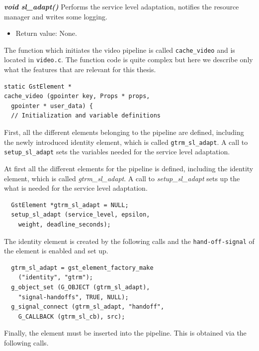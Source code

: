 \documentclass[nobiblatex]{LTHthesis}
\begin{document}
\begin{framed}
	\begin{flushleft}	
		\emph{\textbf{{void sl\_adapt()}}}
		Performs the service level adaptation, notifies the resource manager 
    and writes some logging.
		\begin{itemize}
		\item Return value: None.
		\end{itemize}
		\end{flushleft}
\end{framed}

The function which initiates the video pipeline is called 
\texttt{cache\_video} and is located in \texttt{video.c}. The function code
is quite complex but here we describe only what the features that are
relevant for this thesis.

\begin{lstlisting}
static GstElement *
cache_video (gpointer key, Props * props, 
  gpointer * user_data) {
  // Initialization and variable definitions
\end{lstlisting}

First, all the different elements belonging to the pipeline are defined,
including the newly introduced identity element, which is called 
\texttt{gtrm\_sl\_adapt}. A call to \texttt{setup\_sl\_adapt} sets
the variables needed for the service level adaptation.

At first all the different elements for the pipeline is defined, including the identity element, which is called \emph{gtrm\_sl\_adapt}. A call to \emph{setup\_sl\_adapt} sets up the what is needed for the service level adaptation.
\begin{lstlisting}
  GstElement *gtrm_sl_adapt = NULL;
  setup_sl_adapt (service_level, epsilon, 
    weight, deadline_seconds);
\end{lstlisting}

The identity element is created by the following calls and the 
\texttt{hand-off-signal} of the element is enabled and set up.

\begin{lstlisting}
  gtrm_sl_adapt = gst_element_factory_make 
    ("identity", "gtrm");
  g_object_set (G_OBJECT (gtrm_sl_adapt), 
    "signal-handoffs", TRUE, NULL);
  g_signal_connect (gtrm_sl_adapt, "handoff", 
    G_CALLBACK (gtrm_sl_cb), src);
\end{lstlisting}

Finally, the element must be inserted into the pipeline. This is obtained
via the following calls.
\end{document}
